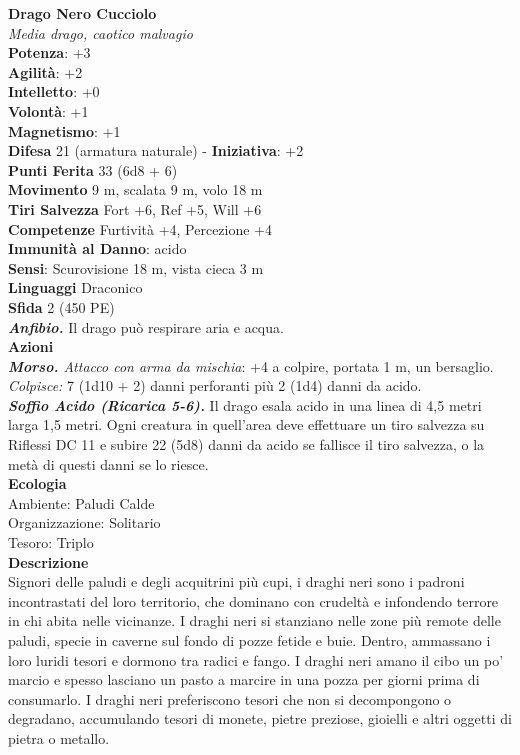 \begin{multicols}{2}
\medskip\textbf{Drago Nero Cucciolo}\\
\emph{Media drago, caotico malvagio}\\
\textbf{Potenza}: +3\\
\textbf{Agilità}: +2\\
\textbf{Intelletto}: +0\\
\textbf{Volontà}: +1\\
\textbf{Magnetismo}: +1\\
\textbf{Difesa} 21 (armatura naturale) - \textbf{Iniziativa}: +2\\
\textbf{Punti Ferita} 33 (6d8 + 6)\\
\textbf{Movimento} 9 m, scalata 9 m, volo 18 m\\
\textbf{Tiri Salvezza} Fort +6, Ref +5, Will +6\\
\textbf{Competenze} Furtività +4, Percezione +4\\
\textbf{Immunità al Danno}: acido\\
\textbf{Sensi}: Scurovisione 18 m, vista cieca 3 m\\
\textbf{Linguaggi} Draconico\\
\textbf{Sfida} 2 (450 PE)\smallskip\\
\emph{\textbf{Anfibio.}} Il drago può respirare aria e acqua.\\
\smallskip\textbf{Azioni}\\
\emph{\textbf{Morso.} Attacco con arma da mischia}: +4 a colpire, portata 1 m, un bersaglio.\\
\emph{Colpisce:} 7 (1d10 + 2) danni perforanti più 2 (1d4) danni da acido.\\
\emph{\textbf{Soffio Acido (Ricarica 5-6).}} Il drago esala acido in una linea di 4,5 metri larga 1,5 metri. Ogni creatura in quell'area deve effettuare un tiro salvezza su Riflessi DC 11 e subire 22 (5d8) danni da acido se fallisce il tiro salvezza, o la metà di questi danni se lo riesce.\\
\textbf{Ecologia}\\
Ambiente: Paludi Calde\\
Organizzazione: Solitario\\
Tesoro: Triplo\\
\textbf{Descrizione}\\
Signori delle paludi e degli acquitrini più cupi, i draghi neri sono i padroni incontrastati del loro territorio, che dominano con crudeltà e infondendo terrore in chi abita nelle vicinanze. I draghi neri si stanziano nelle zone più remote delle paludi, specie in caverne sul fondo di pozze fetide e buie. Dentro, ammassano i loro luridi tesori e dormono tra radici e fango. I draghi neri amano il cibo un po’ marcio e spesso lasciano un pasto a marcire in una pozza per giorni prima di consumarlo. I draghi neri preferiscono tesori che non si decompongono o degradano, accumulando tesori di monete, pietre preziose, gioielli e altri oggetti di pietra o metallo.\\


\end{multicols}

